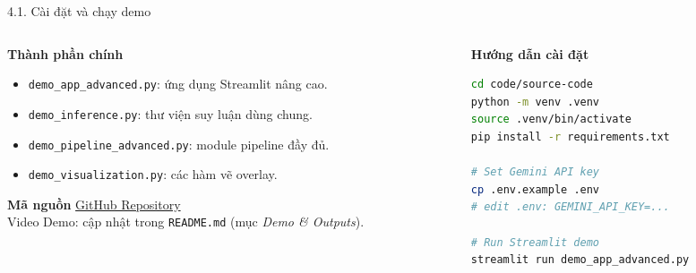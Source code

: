 \documentclass[11pt]{beamer}
\begin{document}
\begin{frame}[fragile, shrink=5]{4.1. Cài đặt và chạy demo}
\scriptsize

\begin{columns}[T,onlytextwidth]
\begin{column}{0.52\textwidth}

\begin{block}{\textbf{Thành phần chính}}
\begin{itemize}
  \item \texttt{demo\_app\_advanced.py}: ứng dụng Streamlit nâng cao.
  \item \texttt{demo\_inference.py}: thư viện suy luận dùng chung.
  \item \texttt{demo\_pipeline\_advanced.py}: module pipeline đầy đủ.
  \item \texttt{demo\_visualization.py}: các hàm vẽ overlay.
\end{itemize}
\end{block}

\begin{block}{\textbf{Mã nguồn}}
\href{https://github.com/paht2005/CS338.Q21_Zero-shot-Object-Coutning-with-Good-Examplers}{GitHub Repository}\\
Video Demo: cập nhật trong \texttt{README.md} (mục \emph{Demo \& Outputs}).
\end{block}

\end{column}

\begin{column}{0.45\textwidth}

\begin{block}{\textbf{Hướng dẫn cài đặt}}
\begin{lstlisting}[style=codestyle, language=bash, numbers=none]
cd code/source-code
python -m venv .venv
source .venv/bin/activate
pip install -r requirements.txt

# Set Gemini API key
cp .env.example .env
# edit .env: GEMINI_API_KEY=...

# Run Streamlit demo
streamlit run demo_app_advanced.py
\end{lstlisting}
\end{block}

\end{column}
\end{columns}

\end{frame}
\end{document}
